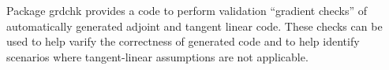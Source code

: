 Package grdchk provides a code to perform validation ``gradient checks'' of 
automatically generated adjoint and tangent linear code. These checks can
be used to help varify the correctness of generated code and to help identify
scenarios where tangent-linear assumptions are not applicable.
